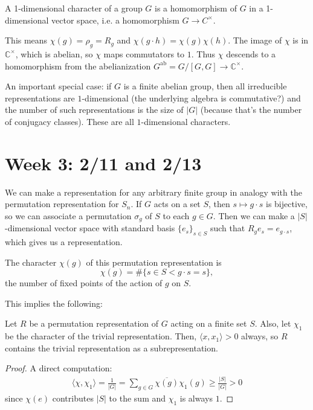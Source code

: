 \documentclass[10pt]{scrartcl}
\providecommand{\ol}{\overline}
\providecommand{\CC}{\mathbb C}
\begin{document}
\begin{definition}
	A 1-dimensional character of a group $G$ is a
	homomorphism of $G$ in a 1-dimensional vector space,
	i.e. a homomorphism $G\to C^\times$.
\end{definition}

This means $\chi(g) = \rho_g = R_g$ and $\chi(g\cdot h) = \chi(g)\chi(h)$.
The image of $\chi$ is in $\CC^\times$, which is abelian, so
$\chi$ maps commutators to $1$. Thus $\chi$ descends to a homomorphism
from the abelianization $G^{\mathrm{ab}} = G/[G,G]\to \CC^\times$.

An important special case: if $G$ is a finite abelian group,
then all irreducible representations are $1$-dimensional
(the underlying algebra is commutative?)
and the number of such representations is the size of $|G|$
(because that's the number of conjugacy classes).
These are all $1$-dimensional characters.

\section{Week 3: 2/11 and 2/13}
We can make a representation for any arbitrary finite group
in analogy with the permutation representation for $S_n$.
If $G$ acts on a set $S$, then $s\mapsto g\cdot s$ is bijective,
so we can associate a permutation $\sigma_g$ of $S$ to each $g\in G$.
Then we can make a $|S|$-dimensional vector space with standard basis
$\{e_s\}_{s\in S}$ such that $R_ge_s = e_{g\cdot s}$,
which gives us a representation.

\begin{lemma}
	The character $\chi(g)$ of this permutation representation is
	\[\chi(g) = \#\{s\in S< g\cdot s = s\},\]
	the number of fixed points of the action of $g$ on $S$.
\end{lemma}

This implies the following:
\begin{lemma}
	Let $R$ be  a permutation representation of $G$ acting on a finite set $S$.
	Also, let $\chi_1$ be the character of the trivial representation.
	Then, $\langle x, x_1\rangle > 0$ always, so $R$ contains
	the trivial representation as a subrepresentation.
\end{lemma}
\begin{proof}
	A direct computation:
	\begin{align*}
		\langle \chi,\chi_1\rangle = \frac{1}{|G|} = \sum_{g\in G}\ol{\chi(g)}\chi_1(g) \ge \frac{|S|}{|G|} > 0
	\end{align*}
	since $\chi(e)$ contributes $|S|$ to the sum and $\chi_1$ is always $1$.
\end{proof}
\end{document}
